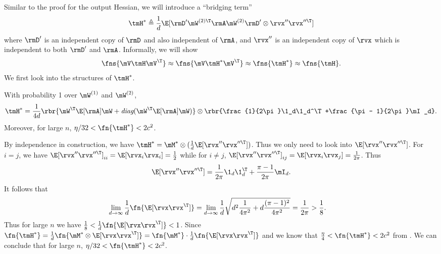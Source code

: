 \begin{proofof}{}
Similar to the proof for the output Hessian, we will introduce a ``bridging term''\begin{equation}
    \tmH^*\triangleq\frac{1}{d}\E[\rmD'\mW^{(2)\T}\rmA\mW^{(2)}\rmD'\otimes\rvx''\rvx''^\T]
\end{equation}
where $\rmD'$ is an independent copy of $\rmD$ and also independent of $\rmA$, and $\rvx''$ is an independent copy of $\rvx$ which is independent to both $\rmD'$ and $\rmA$.
Informally, we will show \begin{equation}
    \fns{\mV\tmH\mV^\T}\approx \fns{\mV\tmH^*\mV^\T}\approx \fns{\tmH^*}\approx \fns{\tmH}.
\end{equation}
We first look into the structures of $\tmH^*$.
\begin{lemma}
\label{lemma:H-star}
With probability 1 over $\mW^{(1)}$ and $\mW^{(2)}$,
\begin{equation}
\label{eqn:proof-H-star}
\tmH^*=\frac{1}{4d}\rbr{\mW^\T\E[\rmA]\mW + \emph{diag}(\mW^\T\E[\rmA]\mW)}\otimes \rbr{\frac{1}{2\pi}\1_d\1_d^\T+\frac{\pi - 1}{2\pi}\mI_d}.
\end{equation}
Moreover, for large $n$, $\eta/32<\fn{\tmH^*}<2c^2$. 
\end{lemma}
\begin{proofof}{}
By independence in construction, we have $\tmH^* = \mM^*\otimes(\frac1d\E[\rvx''\rvx''^\T])$. Thus we only need to look into $\E[\rvx''\rvx''^\T]$.
For $i=j$, we have $\E[\rvx''\rvx''^\T]_{ii}=\E[\rvx_i\rvx_i]=\frac{1}{2}$ while for $i\neq j$, $\E[\rvx''\rvx''^\T]_{ij}=\E[\rvx_i\rvx_j]=\frac{1}{2\pi}$. Thus
\begin{equation}
\label{eqn:xxT-structure}
\E[\rvx''\rvx''^\T]=\frac{1}{2\pi}\1_d\1_d^\T+\frac{\pi - 1}{2\pi}\mI_d.
\end{equation}
It follows that\begin{equation}
\begin{split}
    \lim_{d\to\infty}\frac1d\fn{\E[\rvx\rvx^\T]} &= \lim_{d\to\infty}\frac1d\sqrt{d^2\frac{1}{4\pi^2} + d\frac{(\pi-1)^2}{4\pi^2}} = \frac{1}{2\pi} > \frac{1}{8}.
\end{split}
\end{equation}
Thus for large $n$ we have $\frac18<\frac1d\fn{\E[\rvx\rvx^\T]}<1$.
Since $\fn{\tmH^*} = \frac1d\fn{\mM^*\otimes \E[\rvx\rvx^\T]} = \fn{\mM^*}\cdot\frac1d\fn{\E[\rvx\rvx^\T]}$ and we know that $\frac{\eta}{4}<\fn{\tmH^*}<2c^2$ from . We can conclude that for large $n$, $\eta/32<\fn{\tmH^*}<2c^2$.
\end{proofof}


\end{proofof}
